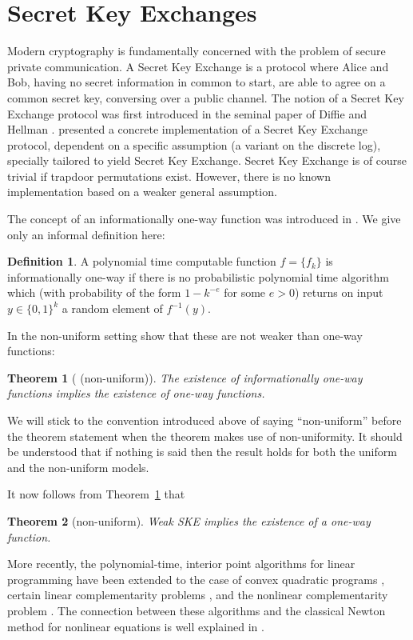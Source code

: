 \documentclass[draft]{amsart}
\newtheorem{thm}{Theorem}[section]
\theoremstyle{definition}
\newtheorem{defn}{Definition}[section]
\theoremstyle{remark}
\newcommand{\thmref}[1]{Theorem~\ref{#1}}
\begin{document}
\section{Secret Key Exchanges}
\label{SKE}

Modern cryptography is fundamentally concerned with the problem of
secure private communication.  A Secret Key Exchange is a protocol
where Alice and Bob, having no secret information in common to start,
are able to agree on a common secret key, conversing over a public
channel.  The notion of a Secret Key Exchange protocol was first
introduced in the seminal paper of Diffie and Hellman
\cite{dihe:newdir}. \cite{dihe:newdir} presented a concrete
implementation of a Secret Key Exchange protocol, dependent on a
specific assumption (a variant on the discrete log), specially
tailored to yield Secret Key Exchange. Secret Key Exchange is of
course trivial if trapdoor permutations exist. However, there is no
known implementation based on a weaker general assumption.

The concept of an informationally one-way function was introduced
in \cite{imlelu:oneway}. We give only an informal definition here:

\begin{defn} A polynomial time
computable function $f = \{f_k\}$ is informationally
one-way if there is no probabilistic polynomial time algorithm which
(with probability of the form $1 - k^{-e}$ for some $e > 0$)
returns on input $y \in \{0,1\}^{k}$ a random element of $f^{-1}(y)$.
\end{defn}
In the non-uniform setting \cite{imlelu:oneway} show that these are not
weaker than one-way functions:
\begin{thm}[\cite{imlelu:oneway} (non-uniform)]
\label{th-info-ow-ow}
The existence of informationally one-way functions
implies the existence of one-way functions.
\end{thm}
We will stick to the convention introduced above of saying
``non-uniform'' before the theorem statement when the theorem
makes use of non-uniformity. It should be understood that
if nothing is said then the result holds for both the uniform and
the non-uniform models.

It now follows from \thmref{th-info-ow-ow} that

\begin{thm}[non-uniform]\label{th-weak-ske-owf} Weak SKE
implies the existence of a one-way function.
\end{thm}

More recently, the
polynomial-time, interior point algorithms for linear programming have
been extended to the case of convex quadratic programs
\cite{moad:quadpro,ye:intalg}, certain linear  complementarity
problems \cite{komiyo:lincomp,miyoki:lincomp}, and the nonlinear
complementarity problem \cite{komiyo:unipfunc}.  The connection between these
algorithms and the classical Newton method for  nonlinear equations is
well explained in \cite{komiyo:lincomp}.
\end{document}
